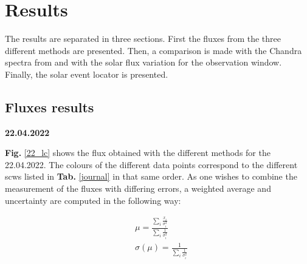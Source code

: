 \section{Results}
The results are separated in three sections. First the fluxes from the three different methods are presented. Then, a comparison is made with the Chandra spectra from \cite{Dennerl2002DiscoveryChandra} and with the solar flux variation for the observation window. Finally, the solar event locator is presented.
    \subsection{Fluxes results}

    
    \textbf{22.04.2022}

    \textbf{Fig.} \ref{22_lc} shows the flux obtained with the different methods for the 22.04.2022. The colours of the different data points correspond to the different scws listed in \textbf{Tab.} \ref{journal} in that same order. As one wishes to combine the measurement of the fluxes with differing errors, a weighted average and uncertainty are computed in the following way:

    \begin{align}
        & \mu = \frac{\sum_i\frac{x_i}{\sigma_i^2}}{\sum_i \frac{1}{\sigma_i^2}} \\
        & \sigma(\mu) = \frac{1}{\sum_i\frac{1}{\sigma_i^2}}
    \end{align}

